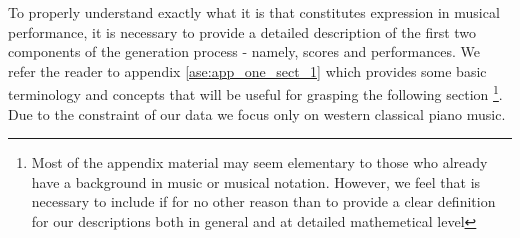 To properly understand exactly what it is that constitutes expression in musical performance, it is necessary to provide a detailed description of the first two components of the generation process - namely, scores and performances. We refer the reader to appendix \ref{ase:app_one_sect_1} which provides some basic terminology and concepts that will be useful for grasping the following section \footnote{Most of the appendix material may seem elementary to those who already have a background in music or musical notation. However, we feel that is necessary to include if for no other reason than to provide a clear definition for our descriptions both in general and at detailed mathemetical level}. Due to the constraint of our data  we focus only on western classical piano music. 




